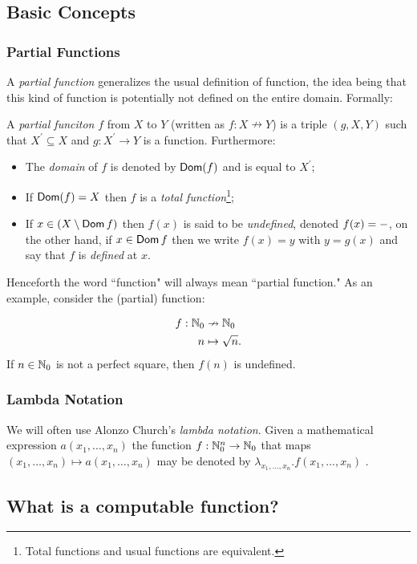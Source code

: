 \subsection{Basic Concepts}
\subsubsection*{Partial Functions}
A \emph{partial function} generalizes the usual definition of function, the idea being that this kind of function is potentially not defined on the entire domain. Formally:
\begin{definition}
	A \emph{partial funciton} $f$ from $X$ to $Y$ (written as $f : X \nrightarrow Y$)  is a triple $(g,X,Y)$ such that $X^\prime \subseteq X$ and $g:X^\prime \to Y$ is a function. Furthermore:
	\begin{itemize}
	 \item 
		The \emph{domain} of $f$ is denoted by $\operatorname{\mathsf{Dom}}(f)$ and is equal to $X^\prime$; 
	 \item
		 If $ \operatorname{\mathsf{Dom}}(f) = X$ then $f$ is a \emph{total function}\footnote{Total functions and usual functions are equivalent.};
	 \item
		 If $x \in (X \setminus \operatorname{\mathsf{Dom}} f)$ then $f(x)$ is said to be \emph{undefined}, denoted $f(x) = \--$, on the other hand, if $x \in \operatorname{\mathsf{Dom}} f$ then we write $f(x) = y$ with $y = g(x)$ and say that $f$ is \emph{defined} at $x$.  
 \end{itemize}
\end{definition}
Henceforth the word ``function" will always mean ``partial function."  As an example, consider the (partial) function:

\begin{align*}
	f : \mathbb{N}_0  & \nrightarrow  \mathbb{N}_0 \\
		n  & \mapsto       \sqrt n.
\end{align*}
If $n \in \mathbb{N}_0$ is not a perfect square, then $f(n)$ is undefined. 

\subsubsection*{Lambda Notation}
We will often use Alonzo Church's \emph{lambda notation}. Given a mathematical expression $a(x_1, \ldots, x_n)$ the function $f: \mathbb{N}_0^n \to \mathbb{N}_0$ that maps $(x_1, \ldots, x_n) \mapsto a(x_1, \ldots, x_n)$ may be denoted by $\lambda_{x_1, \ldots, x_n}.f(x_1, \ldots, x_n)$ .
\subsection{What is a computable function?}
